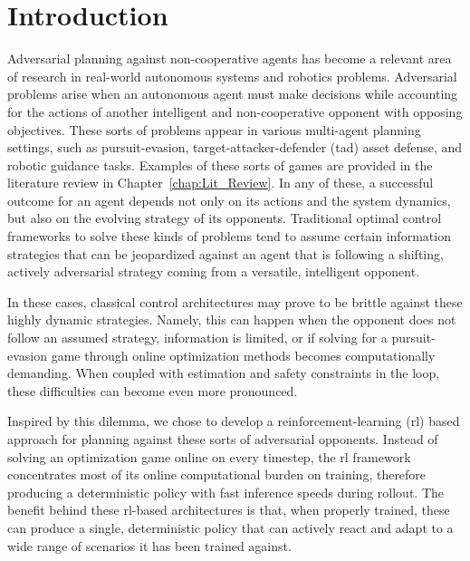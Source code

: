 \chapter{Introduction}


Adversarial planning against non-cooperative agents has become a relevant area of research in real-world autonomous systems and robotics problems. Adversarial problems arise when an autonomous agent must make decisions while accounting for the actions of another intelligent and non-cooperative opponent with opposing objectives. These sorts of problems appear in various multi-agent planning settings, such as pursuit-evasion, target-attacker-defender (\acs{tad}) asset defense, and robotic guidance tasks. Examples of these sorts of games are provided in the literature review in Chapter~\ref{chap:Lit_Review}. In any of these, a successful outcome for an agent depends not only on its actions and the system dynamics, but also on the evolving strategy of its opponents. Traditional optimal control frameworks to solve these kinds of problems tend to assume certain information strategies that can be jeopardized against an agent that is following a shifting, actively adversarial strategy coming from a versatile, intelligent opponent. 

In these cases, classical control architectures may prove to be brittle against these highly dynamic strategies. Namely, this can happen when the opponent does not follow an assumed strategy, information is limited, or if solving for a pursuit-evasion game through online optimization methods becomes computationally demanding. When coupled with estimation and safety constraints in the loop, these difficulties can become even more pronounced.

Inspired by this dilemma, we chose to develop a reinforcement-learning (\acs{rl}) based approach for planning against these sorts of adversarial opponents. Instead of solving an optimization game online on every timestep, the \acs{rl} framework concentrates most of its online computational burden on training, therefore producing a deterministic policy with fast inference speeds during rollout. The benefit behind these \acs{rl}-based architectures is that, when properly trained, these can produce a single, deterministic policy that can actively react and adapt to a wide range of scenarios it has been trained against.

